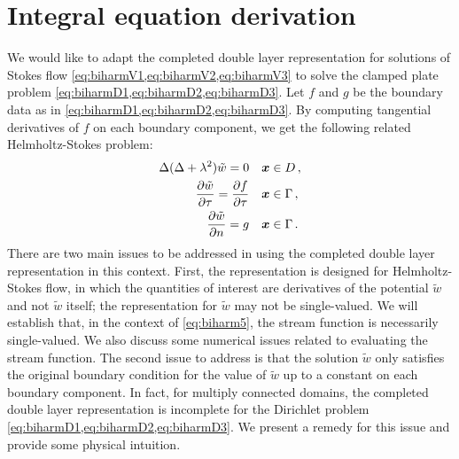
\section{Integral equation derivation} \label{sec:anapp}

We would like to adapt the completed double layer representation
for solutions of Stokes flow \cref{eq:biharmV1,eq:biharmV2,eq:biharmV3} to solve 
the clamped plate problem \cref{eq:biharmD1,eq:biharmD2,eq:biharmD3}.
Let $f$ and $g$ be the boundary data as in \cref{eq:biharmD1,eq:biharmD2,eq:biharmD3}. 
By computing tangential derivatives of $f$ on each
boundary component, we get the following related Helmholtz-Stokes problem:
\begin{align}
 \Delta (\Delta + \lambda^2) \tilde{w}  = 0 &\quad {\boldsymbol x} \in D \, ,\nonumber\\
 \frac{\partial \tilde{w}}{\partial \tau} = 
 \frac{\partial f}{\partial \tau} 
&\quad {\boldsymbol x} \in \Gamma \label{eq:biharm5} \, ,\\ 
 \frac{\partial \tilde{w}}{\partial n} = g &\quad {\boldsymbol x} 
\in \Gamma 
\, . 
\nonumber
\end{align}
There are two main issues to be addressed in using the completed
double layer representation in this context. First,
the representation is designed for 
Helmholtz-Stokes flow, in which the quantities of interest are derivatives
of the potential $\tilde{w}$ and not $\tilde{w}$ itself; the
representation for $\tilde{w}$ may not be single-valued. 
We will establish that, in the context of \cref{eq:biharm5},
the stream function is necessarily single-valued. We also discuss
some numerical issues related to evaluating the stream function.
The second issue to address
is that the solution $\tilde{w}$ only satisfies the original boundary 
condition for the value of $\tilde{w}$ up to a constant on 
each boundary component.
In fact, for multiply connected domains, the completed double layer 
representation is incomplete for the Dirichlet
problem \cref{eq:biharmD1,eq:biharmD2,eq:biharmD3}. We present a remedy for this 
issue and provide some physical intuition.
%
